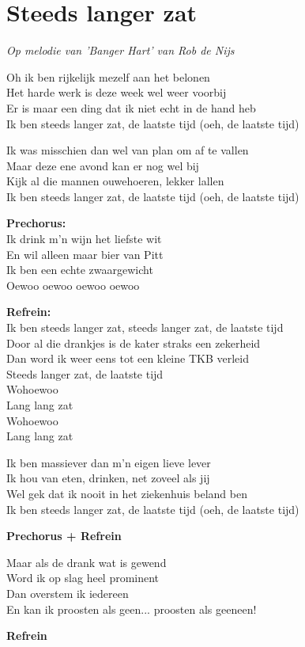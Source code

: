 \section{Steeds langer zat}
\textit{Op melodie van 'Banger Hart' van Rob de Nijs}

Oh ik ben rijkelijk mezelf aan het belonen\\
Het harde werk is deze week wel weer voorbij\\
Er is maar een ding dat ik niet echt in de hand heb\\
Ik ben steeds langer zat, de laatste tijd (oeh, de laatste tijd)

Ik was misschien dan wel van plan om af te vallen\\
Maar deze ene avond kan er nog wel bij\\
Kijk al die mannen ouwehoeren, lekker lallen\\
Ik ben steeds langer zat, de laatste tijd (oeh, de laatste tijd)

\textbf{Prechorus:}\\
Ik drink m'n wijn het liefste wit\\
En wil alleen maar bier van Pitt\\
Ik ben een echte zwaargewicht\\
Oewoo oewoo oewoo oewoo

\textbf{Refrein:}\\
Ik ben steeds langer zat, steeds langer zat, de laatste tijd\\
Door al die drankjes is de kater straks een zekerheid\\
Dan word ik weer eens tot een kleine TKB verleid\\
Steeds langer zat, de laatste tijd\\
Wohoewoo\\
Lang lang zat\\
Wohoewoo\\
Lang lang zat

Ik ben massiever dan m'n eigen lieve lever\\
Ik hou van eten, drinken, net zoveel als jij\\
Wel gek dat ik nooit in het ziekenhuis beland ben\\
Ik ben steeds langer zat, de laatste tijd (oeh, de laatste tijd)

\textbf{Prechorus + Refrein}

Maar als de drank wat is gewend\\
Word ik op slag heel prominent\\
Dan overstem ik iedereen\\
En kan ik proosten als geen... proosten als geeneen!

\textbf{Refrein}